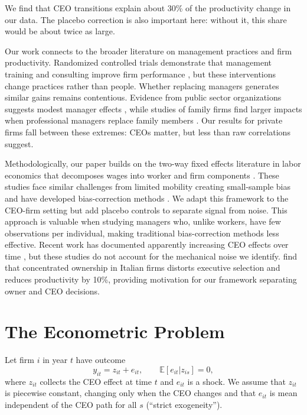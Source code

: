 \documentclass[11pt,a4paper]{article}
\begin{document}
We find that CEO transitions explain about 30\% of the productivity change in our data. The placebo correction is also important here: without it, this share would be about twice as large.

Our work connects to the broader literature on management practices and firm productivity. Randomized controlled trials demonstrate that management training and consulting improve firm performance \citep{bloom2013does, mckenzie2021small}, but these interventions change practices rather than people. Whether replacing managers generates similar gains remains contentious. Evidence from public sector organizations suggests modest manager effects \citep{fenizia2022managers, janke2024role}, while studies of family firms find larger impacts when professional managers replace family members \citep{bennedsen2007inside, sraer2007performance}. Our results for private firms fall between these extremes: CEOs matter, but less than raw correlations suggest.

Methodologically, our paper builds on the two-way fixed effects literature in labor economics that decomposes wages into worker and firm components \citep{Abowd1999Econometrica, Card2018JoLE}. These studies face similar challenges from limited mobility creating small-sample bias \citep{andrews2008high} and have developed bias-correction methods \citep{Bonhomme2023-dx, gaure2014correlation}. We adapt this framework to the CEO-firm setting but add placebo controls to separate signal from noise. This approach is valuable when studying managers who, unlike workers, have few observations per individual, making traditional bias-correction methods less effective. Recent work has documented apparently increasing CEO effects over time \citep{quigley2015has}, but these studies do not account for the mechanical noise we identify. \citet{lippi2014corporate} find that concentrated ownership in Italian firms distorts executive selection and reduces productivity by 10\%, providing motivation for our framework separating owner and CEO decisions.

\section{The Econometric Problem}

Let firm $i$ in year $t$ have outcome
\begin{equation}
  y_{it} = z_{it} + e_{it},\qquad \mathbb E[e_{it}|z_{is}]=0,
\end{equation}
where $z_{it}$ collects the CEO effect at time $t$ and $e_{it}$ is a shock. We assume that $z_{it}$ is piecewise constant, changing only when the CEO changes and that $e_{it}$ is mean independent of the CEO path for all $s$ (``strict exogeneity'').
\end{document}
